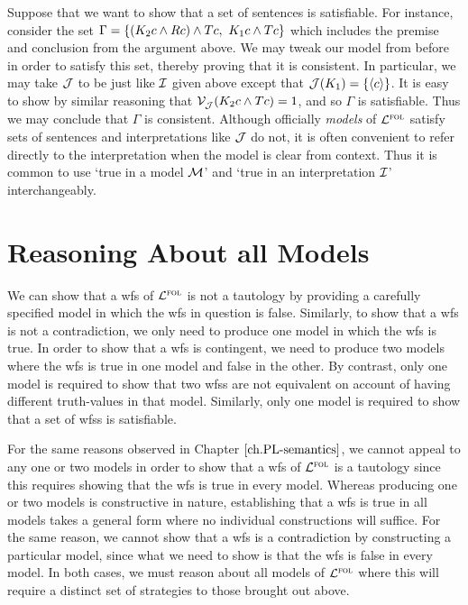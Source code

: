 Suppose that we want to show that a set of sentences is satisfiable.
For instance, consider the set $\Gamma=\lbrace(K_2c \wedge Rc) \wedge Tc,\ K_1c \wedge Tc\rbrace$ which includes the premise and conclusion from the argument above. 
We may tweak our model from before in order to satisfy this set, thereby proving that it is consistent.
In particular, we may take $\mathcal{J}$ to be just like $\mathcal{I}$ given above except that $\mathcal{J}(K_1)=\lbrace\langle c\rangle\rbrace$.
It is easy to show by similar reasoning that $\mathcal{V}_{\mathcal{J}}^{}(K_2c \wedge Tc)=1$, and so $\Gamma$ is satisfiable.
Thus we may conclude that $\Gamma$ is consistent. 
Although officially \textit{models} of $\mathcal{L}^{\textsc{fol}}$ satisfy sets of sentences and interpretations like $\mathcal{J}$ do not, it is often convenient to refer directly to the interpretation when the model is clear from context.
Thus it is common to use `true in a model $\mathcal{M}$' and `true in an interpretation $\mathcal{I}$' interchangeably.







\section{Reasoning About all Models}
\label{sec.allmodelreasoning}

We can show that a wfs of $\mathcal{L}^{\textsc{fol}}$ is not a tautology by providing a carefully specified model in which the wfs in question is false.
Similarly, to show that a wfs is not a contradiction, we only need to produce one model in which the wfs is true.
In order to show that a wfs is contingent, we need to produce two models where the wfs is true in one model and false in the other.
By contrast, only one model is required to show that two wfss are not equivalent on account of having different truth-values in that model.
Similarly, only one model is required to show that a set of wfss is satisfiable.

For the same reasons observed in Chapter $\ref{ch.PL-semantics}$, we cannot appeal to any one or two models in order to show that a wfs of $\mathcal{L}^{\textsc{fol}}$ is a tautology since this requires showing that the wfs is true in every model.
Whereas producing one or two models is constructive in nature, establishing that a wfs is true in all models takes a general form where no individual constructions will suffice.
For the same reason, we cannot show that a wfs is a contradiction by constructing a particular model, since what we need to show is that the wfs is false in every model.
In both cases, we must reason about all models of $\mathcal{L}^{\textsc{fol}}$ where this will require a distinct set of strategies to those brought out above.

